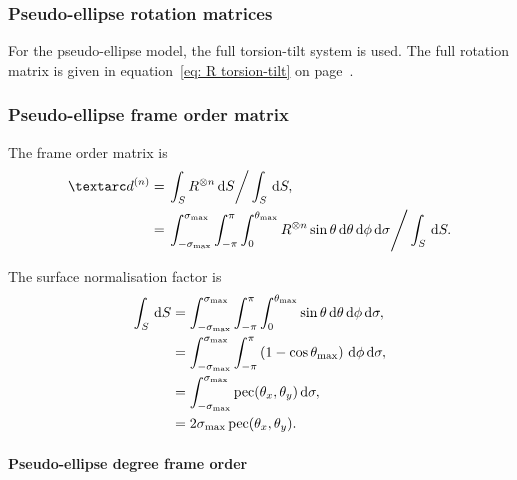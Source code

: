 \subsubsection{Pseudo-ellipse rotation matrices}

For the pseudo-ellipse model, the full torsion-tilt system is used.
The full rotation matrix is given in equation~\ref{eq: R torsion-tilt} on page~\pageref{eq: R torsion-tilt}.



\subsubsection{Pseudo-ellipse frame order matrix}

The frame order matrix is
\begin{subequations}
\begin{align}
    \FOn &= \left. \int_S R^{\otimes n} \diff S \right / \int_S \diff S, \\
         &= \left. \int_{-\conesmax}^{\conesmax} \int_{-\pi}^{\pi} \int_{0}^{\conethetamax} R^{\otimes n} \sin\theta \diff\theta \diff\phi \diff\sigma  \right / \int_S \diff S .
\end{align}
\end{subequations}

The surface normalisation factor is
\begin{subequations}
\begin{align}
    \int_S \,\mathrm{d} S &= \int_{-\sigma_\textrm{max}}^{\sigma_\textrm{max}} \int_{-\pi}^{\pi} \int_{0}^{\theta_\textrm{max}} \sin\theta \,\mathrm{d}\theta \,\mathrm{d}\phi \,\mathrm{d}\sigma , \\
                   &= \int_{-\sigma_\textrm{max}}^{\sigma_\textrm{max}} \int_{-\pi}^{\pi} \left( 1 - \cos\theta_\textrm{max} \right) \,\mathrm{d}\phi \,\mathrm{d}\sigma , \label{eq: pseudo-ellipse surface norm non-integratable} \\
                   &= \int_{-\sigma_\textrm{max}}^{\sigma_\textrm{max}} \operatorname{pec}(\theta_x, \theta_y) \,\mathrm{d}\sigma , \\
                   &= 2\sigma_\textrm{max} \operatorname{pec}(\theta_x, \theta_y) .
\end{align}
\end{subequations}

\paragraph{Pseudo-ellipse  degree frame order}

